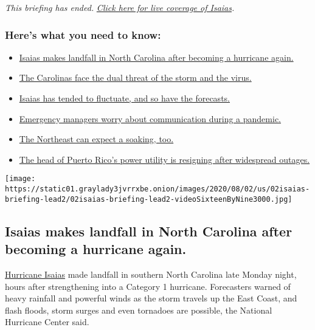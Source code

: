 \emph{This briefing has ended.}
\href{https://www.nytimes3xbfgragh.onion/2020/08/04/us/isaias-storm-updates.html}{\emph{Click
here for live coverage of Isaias}}\emph{.}

\hypertarget{heres-what-you-need-to-know}{%
\subsubsection{Here's what you need to
know:}\label{heres-what-you-need-to-know}}

\begin{itemize}
\tightlist
\item
  \protect\hyperlink{link-34a2c843}{Isaias makes landfall in North
  Carolina after becoming a hurricane again.}
\item
  \protect\hyperlink{link-f7e08eb}{The Carolinas face the dual threat of
  the storm and the virus.}
\item
  \protect\hyperlink{link-64deafd3}{Isaias has tended to fluctuate, and
  so have the forecasts.}
\item
  \protect\hyperlink{link-536a9c31}{Emergency managers worry about
  communication during a pandemic.}
\item
  \protect\hyperlink{link-52f7dcb}{The Northeast can expect a soaking,
  too.}
\item
  \protect\hyperlink{link-303d84ae}{The head of Puerto Rico's power
  utility is resigning after widespread outages.}
\end{itemize}

\texttt{[image: https://static01.graylady3jvrrxbe.onion/images/2020/08/02/us/02isaias-briefing-lead2/02isaias-briefing-lead2-videoSixteenByNine3000.jpg]}

\hypertarget{isaias-makes-landfall-in-north-carolina-after-becoming-a-hurricane-again}{%
\subsection{Isaias makes landfall in North Carolina after becoming a
hurricane
again.}\label{isaias-makes-landfall-in-north-carolina-after-becoming-a-hurricane-again}}

\href{https://www.nytimes3xbfgragh.onion/2020/08/04/nyregion/isaias-tropical-storm-nyc.html}{Hurricane
Isaias} made landfall in southern North Carolina late Monday night,
hours after strengthening into a Category 1 hurricane. Forecasters
warned of heavy rainfall and powerful winds as the storm travels up the
East Coast, and flash floods, storm surges and even tornadoes are
possible, the National Hurricane Center said.

